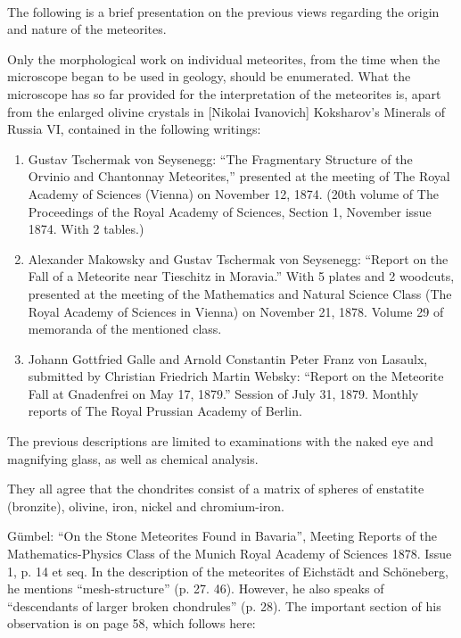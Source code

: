 \documentclass[a4paper, 11pt, oneside]{article}
\begin{document}
\paragraph{}
The following is a brief presentation on the previous views regarding the origin and nature of the meteorites.

Only the morphological work on individual meteorites, from the time when the microscope began to be used in geology, should be enumerated. What the microscope has so far provided for the interpretation of the meteorites is, apart from the enlarged olivine crystals in [Nikolai Ivanovich] Koksharov's Minerals of Russia VI, contained in the following writings:
\begin{enumerate}
    \item Gustav Tschermak von Seysenegg: ``The Fragmentary Structure of the Orvinio and Chantonnay Meteorites,'' presented at the meeting of The Royal Academy of Sciences (Vienna) on November 12, 1874. (20th volume of The Proceedings of the Royal Academy of Sciences, Section 1, November issue 1874. With 2 tables.)
    \item Alexander Makowsky and Gustav Tschermak von Seysenegg: ``Report on the Fall of a Meteorite near Tieschitz in Moravia.'' With 5 plates and 2 woodcuts, presented at the meeting of the Mathematics and Natural Science Class (The Royal Academy of Sciences in Vienna) on November 21, 1878. Volume 29 of memoranda of the mentioned class.
    \item Johann Gottfried Galle and Arnold Constantin Peter Franz von Lasaulx, submitted by Christian Friedrich Martin Websky: ``Report on the Meteorite Fall at Gnadenfrei on May 17, 1879.'' Session of July 31, 1879. Monthly reports of The Royal Prussian Academy of Berlin.
\end{enumerate}
The previous descriptions are limited to examinations with the naked eye and magnifying glass, as well as chemical analysis.

They all agree that the chondrites consist of a matrix of spheres of enstatite (bronzite), olivine, iron, nickel and chromium-iron.

Gümbel: ``On the Stone Meteorites Found in Bavaria'', Meeting Reports of the Mathematics-Physics Class of the Munich Royal Academy of Sciences 1878. Issue 1, p. 14 et seq. In the description of the meteorites of Eichstädt and Schöneberg, he mentions ``mesh-structure'' (p. 27. 46). However, he also speaks of ``descendants of larger broken chondrules'' (p. 28). The important section of his observation is on page 58, which follows here:
\end{document}
